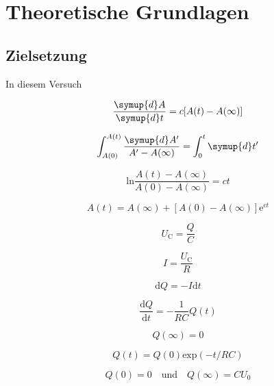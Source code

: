 \section{Theoretische Grundlagen}

    \subsection{Zielsetzung}
        In diesem Versuch 

    \begin{equation}
        \frac{\symup{d}A}{\symup{d}t}=c[A(t)-A(\infty)]
    \end{equation}

    \begin{equation}
        \int_{A(0)}^{A(t)} \frac{\symup{d}A'}{A' - A(\infty)} = \int_0^t \symup{d}t'
    \end{equation}

    \begin{equation}
        \text{ln} \frac{A(t) - A(\infty)}{A(0) - A(\infty)} = ct
    \end{equation}

    \begin{equation}
        A(t) = A(\infty) + [A(0) - A(\infty)] \text{e}^{ct}
    \end{equation}

    \begin{equation}
        U_{\text{C}} = \frac{Q}{C}
    \end{equation}

    \begin{equation}
        I = \frac{U_{\text{C}}}{R}
    \end{equation}

    \begin{equation}
        \text{d}Q = -I \text{d}t
    \end{equation}

    \begin{equation}
        \frac{\text{d}Q}{\text{d}t} = - \frac{1}{RC} Q(t)
    \end{equation}

    \begin{equation}
        Q(\infty) = 0
    \end{equation}

    \begin{equation}
        Q(t) = Q(0) \text{exp}(-t/RC)
    \end{equation}

    \begin{equation}
        Q(0) = 0 \quad \text{und} \quad Q(\infty) = CU_0 
    \end{equation}

